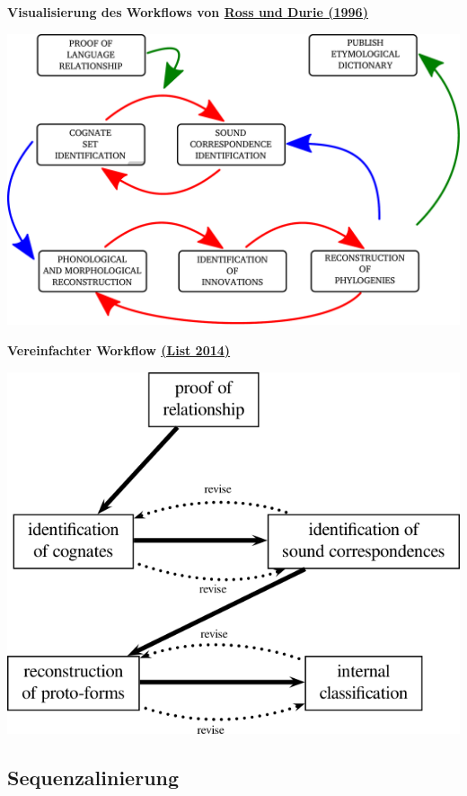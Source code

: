\par\noindent\textbf{Visualisierung des Workflows von
\href{http://bibliography.lingpy.org?key=Ross1996}{Ross und Durie
(1996)}}

\includegraphics[width=\textwidth]{img/ross-durie-workflow.pdf}



\par\noindent\textbf{Vereinfachter Workflow
\href{http://bibliography.lingpy.org?key=List2014d}{(List 2014)}}

\href{img/cm-simplified.png}{\includegraphics{img/cm-simplified.png}}

\subsection{\texorpdfstring{{Sequenzalinierung}}{Sequenzalinierung}}

